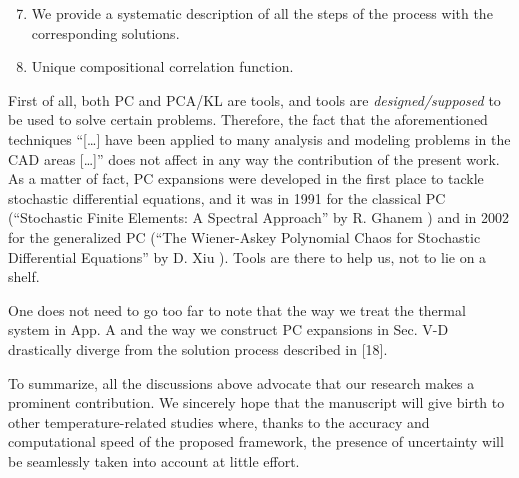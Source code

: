 \begin{authors}
\begin{enumerate}
  \setcounter{enumi}{6}
  \item We provide a systematic description of all the steps of the process with the corresponding solutions.
\end{enumerate}

\begin{enumerate}
  \setcounter{enumi}{7}
  \item Unique compositional correlation function.
\end{enumerate}

First of all, both PC and PCA/KL are tools, and tools are \emph{designed/supposed} to be used to solve certain problems.
Therefore, the fact that the aforementioned techniques ``[\ldots] have been applied to many analysis and modeling problems in the CAD areas [\ldots]'' does not affect in any way the contribution of the present work.
As a matter of fact, PC expansions were developed in the first place to tackle stochastic differential equations, and it was in 1991 for the classical PC (``Stochastic Finite Elements: A Spectral Approach'' by R. Ghanem \etal) and in 2002 for the generalized PC (``The Wiener-Askey Polynomial Chaos for Stochastic Differential Equations'' by D. Xiu \etal).
Tools are there to help us, not to lie on a shelf.

One does not need to go too far to note that the way we treat the thermal system in App. A and the way we construct PC expansions in Sec. V-D drastically diverge from the solution process described in [18].

To summarize, all the discussions above advocate that our research makes a prominent contribution.
We sincerely hope that the manuscript will give birth to other temperature-related studies where, thanks to the accuracy and computational speed of the proposed framework, the presence of uncertainty will be seamlessly taken into account at little effort.


\end{authors}

